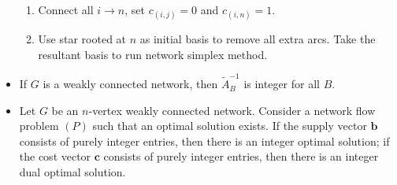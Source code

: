 \documentclass[10pt]{article}
\begin{document}
\begin{multicols*}{3}
\begin{itemize}
\begin{enumerate}
                \item Connect all $i \to n$, set $c_{(i, j)} = 0$ and $c_{(i, n)} = 1$.
                \item Use star rooted at $n$ as initial basis to remove all extra arcs. Take the resultant basis to run network simplex method.
            \end{enumerate}
            \item If $G$ is a weakly connected network, then $\widetilde{A}_B^{-1}$ is integer for all $B$.
            \item Let $G$ be an $n$-vertex weakly connected network. Consider a network flow problem $(P)$ such that an optimal solution exists. If the supply vector $\bm{b}$ consists of purely integer entries, then there is an integer optimal solution; if the cost vector $\bm{c}$ consists of purely integer entries, then there is an integer dual optimal solution.
        \end{itemize}
    \end{multicols*}
\end{document}
